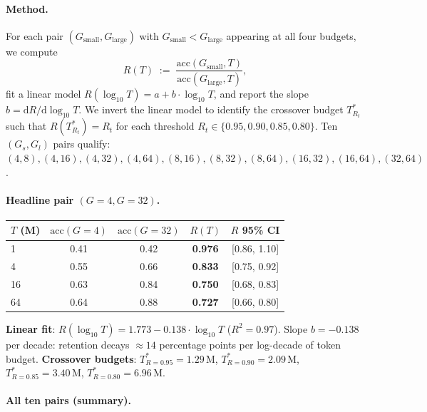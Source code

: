 \paragraph{Method.}
For each pair $(G_{\mathrm{small}}, G_{\mathrm{large}})$ with
$G_{\mathrm{small}} < G_{\mathrm{large}}$ appearing at all four budgets,
we compute
\begin{equation}
  R(T) \;:=\; \frac{\mathrm{acc}(G_{\mathrm{small}}, T)}
                 {\mathrm{acc}(G_{\mathrm{large}}, T)},
  \label{eq:iter87-r}
\end{equation}
fit a linear model $R(\log_{10} T) = a + b \cdot \log_{10} T$, and
report the slope $b = \mathrm{d}R/\mathrm{d}\log_{10} T$.  We invert the
linear model to identify the crossover budget $T^*_{R_t}$ such that
$R(T^*_{R_t}) = R_t$ for each threshold $R_t \in \{0.95, 0.90, 0.85,
0.80\}$.  Ten $(G_s, G_l)$ pairs qualify: $(4,8), (4,16), (4,32),
(4,64), (8,16), (8,32), (8,64), (16,32), (16,64), (32,64)$.

\paragraph{Headline pair $(G{=}4, G{=}32)$.}

\begin{center}
\small
\begin{tabular}{lcccc}
\toprule
$T$ (M) & $\mathrm{acc}(G{=}4)$ & $\mathrm{acc}(G{=}32)$ & $R(T)$ & $R$ 95\% CI \\
\midrule
  1 & 0.41 & 0.42 & \textbf{0.976} & [0.86, 1.10] \\
  4 & 0.55 & 0.66 & \textbf{0.833} & [0.75, 0.92] \\
 16 & 0.63 & 0.84 & \textbf{0.750} & [0.68, 0.83] \\
 64 & 0.64 & 0.88 & \textbf{0.727} & [0.66, 0.80] \\
\bottomrule
\end{tabular}
\end{center}

\noindent
\textbf{Linear fit}: $R(\log_{10} T) = 1.773 - 0.138 \cdot \log_{10} T$
($R^2 = 0.97$).  Slope $b = -0.138$ per decade: retention decays
$\approx 14$ percentage points per log-decade of token budget.
\textbf{Crossover budgets}:
$T^*_{R=0.95} = 1.29\,\mathrm{M}$,
$T^*_{R=0.90} = 2.09\,\mathrm{M}$,
$T^*_{R=0.85} = 3.40\,\mathrm{M}$,
$T^*_{R=0.80} = 6.96\,\mathrm{M}$.

\paragraph{All ten pairs (summary).}

